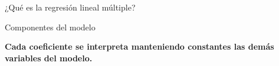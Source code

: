\documentclass[aspectratio=169,11pt]{beamer}
\newcommand{\destaca}[1]{%
  {\color{cPrim}\bfseries #1}%
}
\newenvironment{cerrado}[1]
  {\begin{block}{#1}
   \begin{minipage}{\linewidth}
   \raggedright}
  {\end{minipage}
   \end{block}}
\begin{document}
\begin{frame}{¿Qué es la regresión lineal múltiple?}
\begin{center}
\begin{minipage}{0.90\textwidth}
\begin{cerrado}{Componentes del modelo}
\begin{itemize}
        \end{itemize}

      \end{cerrado}

      \vspace{0.3em}

      \begin{center}
        \destaca{Cada coeficiente se interpreta manteniendo constantes
        las demás variables del modelo.}
      \end{center}

    \end{minipage}
  \end{center}

\end{frame}


\end{document}
